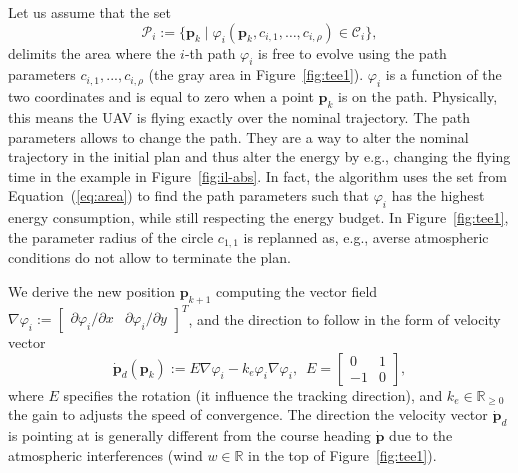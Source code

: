 \documentclass[letterpaper,10pt,conference]{ieeeconf}
\theoremstyle{definition}
\begin{document}

Let us assume that the set
\begin{equation}\label{eq:area}
  \mathcal{P}_i:=\{\mathbf{p}_k\mid\varphi_i(\mathbf{p}_k,c_{i,1},\dots,c_{i,\rho})\in\mathcal{C}_i\},
\end{equation}
delimits the area where the $i$-th path $\varphi_i$ is free to evolve using the path parameters $c_{i,1},...,c_{i,\rho}$ (the gray area in Figure~\ref{fig:tee1}). $\varphi_i$ is a function of the two coordinates and is equal to zero when a point $\mathbf{p}_k$ is on the path. Physically, this means the UAV is flying exactly over the nominal trajectory. The path parameters allows to change the path. They are a way to alter the nominal trajectory in the initial plan and thus alter the energy by e.g., changing the flying time in the example in Figure~\ref{fig:il-abs}.
In fact, the algorithm uses the set from Equation~(\ref{eq:area}) to find the path parameters such that $\varphi_i$ has the highest energy consumption, while still respecting the energy budget. In Figure~\ref{fig:tee1}, the parameter radius of the circle $c_{1,1}$ is replanned as, e.g., averse atmospheric conditions do not allow to terminate the plan.

We derive the new position $\mathbf{p}_{k+1}$ computing the vector field $\nabla\varphi_i:=\begin{bmatrix}\partial\varphi_i/\partial x & \partial\varphi_i/\partial y\end{bmatrix}^T$, and the direction to follow in the form of velocity vector~\cite{de2017guidance}
\begin{equation}\label{eq:pd}
  \dot{\mathbf{p}}_d(\mathbf{p}_k):=E\nabla\varphi_i-k_e\varphi_i\nabla\varphi_i,\,\,\,E=\begin{bmatrix}
    0&1\\-1&0
  \end{bmatrix},
\end{equation}
where $E$ specifies the rotation (it influence the tracking direction), and $k_e\in\mathbb{R}_{\geq 0}$ the gain to adjusts the speed of convergence. The direction the velocity vector $\dot{\mathbf{p}}_d$ is pointing at is generally different from the course heading $\dot{\mathbf{p}}$ due to the atmospheric interferences (wind $w\in\mathbb{R}$ in the top of Figure~\ref{fig:tee1}).
\end{document}
